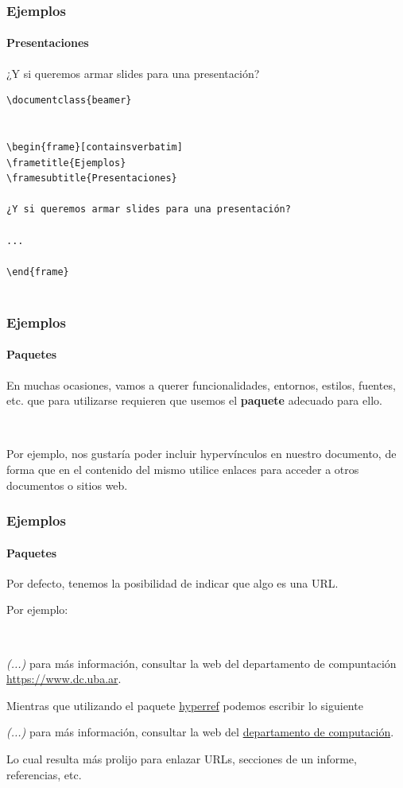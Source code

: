 \begin{frame}[containsverbatim]
\frametitle{Ejemplos}
\framesubtitle{Presentaciones}

¿Y si queremos armar slides para una presentación?

\begin{lstlisting}
\documentclass{beamer}


\begin{frame}[containsverbatim]
\frametitle{Ejemplos}
\framesubtitle{Presentaciones}

¿Y si queremos armar slides para una presentación?

...

\end{frame}


\end{lstlisting}

\end{frame}

\begin{frame}
\frametitle{Ejemplos}
\framesubtitle{Paquetes}

En muchas ocasiones, vamos a querer funcionalidades, entornos, estilos, fuentes, etc. que para utilizarse requieren que usemos el \textbf{paquete} adecuado para ello.

\

Por ejemplo, nos gustaría poder incluir hypervínculos en nuestro documento, de forma que en el contenido del mismo utilice enlaces para acceder a otros documentos o sitios web.
\end{frame}

\begin{frame}
\frametitle{Ejemplos}
\framesubtitle{Paquetes}

Por defecto, tenemos la posibilidad de indicar que algo es una URL. 

Por ejemplo:

\

\begin{center}
\textit{(...)} para más información, consultar la web del departamento de compuntación \url{https://www.dc.uba.ar}.
\end{center}

\pause

Mientras que utilizando el paquete \href{https://ctan.org/pkg/hyperref}{hyperref} podemos escribir lo siguiente


\begin{center}
\textit{(...)} para más información, consultar la web del \href{https://www.dc.uba.ar}{departamento de computación}.
\end{center}

Lo cual resulta más prolijo para enlazar URLs, secciones de un informe, referencias, etc.

\end{frame}
